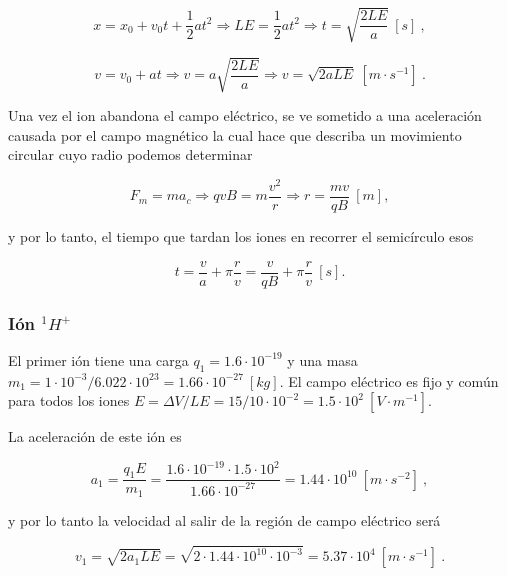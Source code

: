\documentclass[journal]{IEEEtran}
\begin{document}
\begin{equation}
x = x_0 + v_0t + \displaystyle\frac{1}{2}at^2 \Rightarrow LE = \displaystyle\frac{1}{2}at^2 \Rightarrow t = \sqrt{\displaystyle\frac{2LE}{a}}~[s]~,
\end{equation}

\begin{equation}
v = v_0 + at \Rightarrow v = a\sqrt{\displaystyle\frac{2LE}{a}} \Rightarrow v = \sqrt{2aLE}~[m\cdot s^{-1}]~.
\end{equation}

Una vez el ion abandona el campo eléctrico, se ve sometido a una aceleración causada por el campo magnético la cual hace que describa un movimiento circular cuyo radio podemos determinar

\begin{equation}
F_m = ma_c \Rightarrow qvB = m \displaystyle\frac{v^2}{r} \Rightarrow r = \displaystyle\frac{mv}{qB}~[m],
\end{equation}

y por lo tanto, el tiempo que tardan los iones en recorrer el semicírculo esos

\begin{equation}
t = \displaystyle\frac{v}{a} + \pi \displaystyle\frac{r}{v} = \displaystyle\frac{v}{qB} + \pi \displaystyle\frac{r}{v}~[s].
\end{equation}

\subsubsection{Ión $^1H^+$}

El primer ión tiene una carga $q_1 = 1.6\cdot 10^{-19}$ y una masa $m_1 = 1\cdot 10^{-3} / 6.022\cdot 10^{23} = 1.66\cdot 10^{-27}~[kg]$. El campo eléctrico es fijo y común para todos los iones $E = \Delta V / LE = 15 / 10\cdot 10^{-2} = 1.5\cdot 10^2~[V\cdot m^{-1}]$.

La aceleración de este ión es

\begin{equation}
a_1 = \displaystyle\frac{q_1E}{m_1} = \displaystyle\frac{1.6\cdot 10^{-19}\cdot 1.5\cdot 10^{2}}{1.66\cdot 10^{-27}} = 1.44 \cdot 10^{10}~[m\cdot s^{-2}]~,
\end{equation}

y por lo tanto la velocidad al salir de la región de campo eléctrico será

\begin{equation}
    v_1 = \sqrt{2a_1LE} = \sqrt{2\cdot 1.44\cdot 10^{10} \cdot 10^{-3}} = 5.37 \cdot 10^4~[m\cdot s^{-1}]~.
\end{equation}
\end{document}

